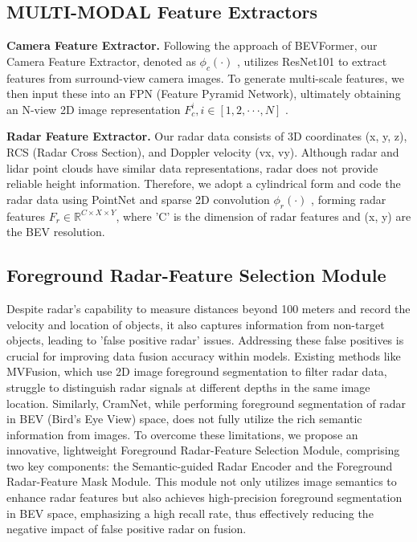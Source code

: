 \documentclass{article}
\begin{document}
\subsection{MULTI-MODAL Feature Extractors}
\noindent \textbf{Camera Feature Extractor.} Following the approach of BEVFormer, our Camera Feature Extractor, denoted as $ \phi_{c} (\cdot ) $ , utilizes ResNet101 to extract features from surround-view camera images. To generate multi-scale features, we then input these into an FPN (Feature Pyramid Network), ultimately obtaining an N-view 2D image representation  $ F^{i}_{c},i\in [1,2,\cdot \cdot \cdot ,N] $ .

\noindent \textbf{Radar Feature Extractor.} Our radar data consists of 3D coordinates (x, y, z), RCS (Radar Cross Section), and Doppler velocity (vx, vy). Although radar and lidar point clouds have similar data representations, radar does not provide reliable height information. Therefore, we adopt a cylindrical form and code the radar data using PointNet and sparse 2D convolution $\phi_{r} (\cdot )$ , forming radar features $F^{}_{r}\in \mathbb{R}^{C\times X\times Y} $, where 'C' is the dimension of radar features and (x, y) are the BEV resolution.


\subsection{Foreground Radar-Feature Selection Module}
Despite radar's capability to measure distances beyond 100 meters and record the velocity and location of objects, it also captures information from non-target objects, leading to 'false positive radar' issues. Addressing these false positives is crucial for improving data fusion accuracy within models. Existing methods like MVFusion, which use 2D image foreground segmentation to filter radar data, struggle to distinguish radar signals at different depths in the same image location. Similarly, CramNet, while performing foreground segmentation of radar in BEV (Bird's Eye View) space, does not fully utilize the rich semantic information from images. To overcome these limitations, we propose an innovative, lightweight Foreground Radar-Feature Selection Module, comprising two key components: the Semantic-guided Radar Encoder and the Foreground Radar-Feature Mask Module. This module not only utilizes image semantics to enhance radar features but also achieves high-precision foreground segmentation in BEV space, emphasizing a high recall rate, thus effectively reducing the negative impact of false positive radar on fusion.
\end{document}
